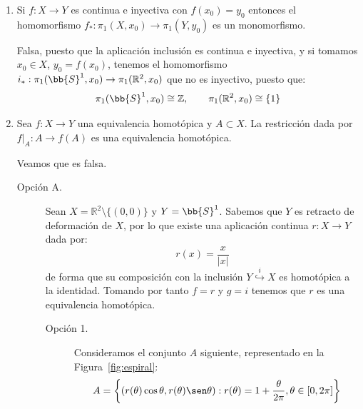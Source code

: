 \begin{ejercicio}
\begin{enumerate}[label=\alph*)]
            Verdadera, puesto que si $A$ es un retracto de $X$, entonces fijado $x_0\in A$ la aplicación inclusión $i:A\to X$ induce un monomorfismo entre grupos fundamentales $i_\ast:\pi_1(A,x_0)\to \pi_1(X,x_0)$. Como
            \begin{equation*}
                \pi_1(X,x_0) \cong \{1\}
            \end{equation*}
            ha de ser $\pi_1(A,x_0)\cong \{1\}$. Además, por ser $A$ un retracto de $X$, existe una aplicación $r:X\to A$ continua de forma que $r(a) = a \quad \forall a\in A$, por lo que $A = r(X)$, y como $X$ es arcoconexo $A$ también debe serlo.
        \item Si $f:X\to Y$ es continua e inyectiva con $f(x_0)=y_0$ entonces el homomorfismo $f_\ast:\pi_1(X,x_0)\to \pi_1(Y,y_0)$ es un monomorfismo.

            Falsa, puesto que la aplicación inclusión
            es continua e inyectiva, y si tomamos $x_0\in X$, $y_0 = f(x_0)$, tenemos el homomorfismo $i_\ast:\pi_1(\bb{S}^1,x_0)\to \pi_1(\mathbb{R}^2, x_0)$ que no es inyectivo, puesto que:
            \begin{equation*}
                \pi_1(\bb{S}^1,x_0) \cong \mathbb{Z}, \qquad \pi_1(\mathbb{R}^2,x_0)\cong \{1\}
            \end{equation*}
        \item Sea $f:X\to Y$ una equivalencia homotópica y $A\subset X$. La restricción dada por $f\big|_A:A\to f(A)$ es una equivalencia homotópica. 
            
            Veamos que es falsa.
            \begin{description}
                \item[Opción A.] Sean $X=\mathbb{R}^2\setminus \{(0,0)\}$ y $Y = \bb{S}^1$. Sabemos que $Y$ es retracto de deformación de $X$, por lo que existe una aplicación continua $r:X\to Y$ dada por:
                \begin{equation*}
                    r(x) = \frac{x}{|x|}
                \end{equation*}
                de forma que su composición con la inclusión $Y\stackrel{i}{\hookrightarrow} X$ es homotópica a la identidad. Tomando por tanto $f=r$ y $g=i$ tenemos que $r$ es una equivalencia homotópica.
                \begin{description}
                    \item [Opción 1.] 
                        Consideramos el conjunto $A$ siguiente, representado en la Figura~\ref{fig:espiral}: 
                        \begin{equation*}
                            A = \left\{(r(\theta)\cos\theta, r(\theta)\sen\theta) : r(\theta) = 1 + \frac{\theta}{2\pi}, \theta \in [0,2\pi]\right\}
                        \end{equation*}


\end{description}
\end{description}
\end{enumerate}
\end{ejercicio}
